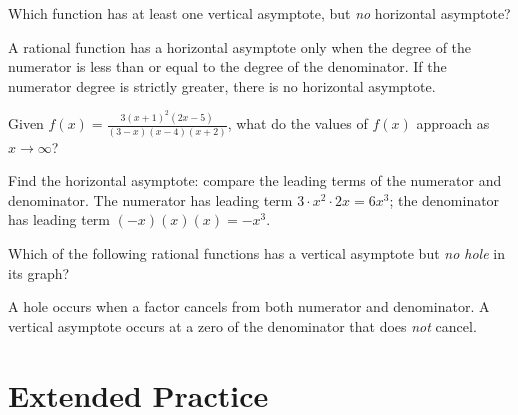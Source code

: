 \documentclass{ximera}
\begin{document}
\begin{problem}
Which function has at least one vertical asymptote, but \emph{no} horizontal asymptote?
\begin{hint}
A rational function has a horizontal asymptote only when the degree of the numerator is less than or equal to the degree of the denominator. If the numerator degree is strictly greater, there is no horizontal asymptote.
\end{hint}
\begin{multipleChoice}
\end{multipleChoice}
\end{problem}

\begin{problem}
Given $\displaystyle f(x)=\frac{3(x+1)^2(2x-5)}{(3-x)(x-4)(x+2)}$, what do the values of $f(x)$ approach as $x\to\infty$?
\begin{hint}
Find the horizontal asymptote: compare the leading terms of the numerator and denominator. The numerator has leading term $3 \cdot x^2 \cdot 2x = 6x^3$; the denominator has leading term $(-x)(x)(x) = -x^3$.
\end{hint}
\begin{multipleChoice}
  \choice{$\infty$}
\end{multipleChoice}
\end{problem}

\begin{problem}
Which of the following rational functions has a vertical asymptote but \emph{no hole} in its graph?
\begin{hint}
A hole occurs when a factor cancels from both numerator and denominator. A vertical asymptote occurs at a zero of the denominator that does \emph{not} cancel.
\end{hint}
\begin{multipleChoice}
\end{multipleChoice}
\end{problem}


\bigskip
\section*{Extended Practice}
\end{document}
